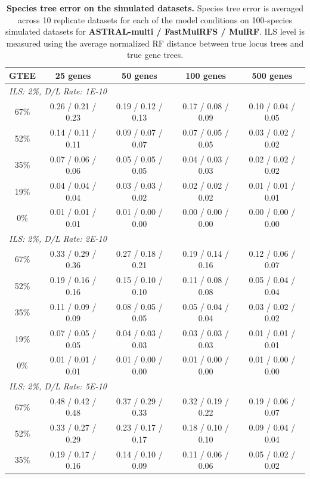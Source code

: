 \begin{table}[!h]
\centering
\setlength{\tabcolsep}{6pt}
\small
\caption{{\bf Species tree error on the simulated datasets.} Species tree error is averaged across 10 replicate datasets for each of the model conditions on 100-species simulated datasets for  \textbf{ASTRAL-multi / FastMulRFS / MulRF}. ILS level is
measured using the average normalized RF distance between true locus trees and true gene trees.}
\label{tab:fastmulrfs-error}
\begin{tabular}{ccccc}
\toprule
GTEE & 25 genes & 50 genes & 100 genes & 500 genes\\
\midrule
\multicolumn{5}{l}{\em ILS: 2\%, D/L Rate: 1E-10}\\[0.5ex]
67\% & 0.26 / 0.21 / 0.23 & 0.19 / 0.12 / 0.13 & 0.17 / 0.08 / 0.09 & 0.10 / 0.04 / 0.05\\
52\% & 0.14 / 0.11 / 0.11 & 0.09 / 0.07 / 0.07 & 0.07 / 0.05 / 0.05 & 0.03 / 0.02 / 0.02\\
35\% & 0.07 / 0.06 / 0.06 & 0.05 / 0.05 / 0.05 & 0.04 / 0.03 / 0.03 & 0.02 / 0.02 / 0.02\\
19\% & 0.04 / 0.04 / 0.04 & 0.03 / 0.03 / 0.02 & 0.02 / 0.02 / 0.02 & 0.01 / 0.01 / 0.01\\
0\% & 0.01 / 0.01 / 0.01 & 0.01 / 0.00 / 0.00 & 0.00 / 0.00 / 0.00 & 0.00 / 0.00 / 0.00\\[2ex]
\multicolumn{5}{l}{\em ILS: 2\%, D/L Rate: 2E-10}\\[0.5ex]
67\% & 0.33 / 0.29 / 0.36 & 0.27 / 0.18 / 0.21 & 0.19 / 0.14 / 0.16 & 0.12 / 0.06 / 0.07\\
52\% & 0.19 / 0.16 / 0.16 & 0.15 / 0.10 / 0.10 & 0.11 / 0.08 / 0.08 & 0.05 / 0.04 / 0.04\\
35\% & 0.11 / 0.09 / 0.09 & 0.08 / 0.05 / 0.05 & 0.05 / 0.04 / 0.04 & 0.03 / 0.02 / 0.02\\
19\% & 0.07 / 0.05 / 0.05 & 0.04 / 0.03 / 0.03 & 0.03 / 0.03 / 0.03 & 0.01 / 0.01 / 0.01\\
0\% & 0.01 / 0.01 / 0.01 & 0.01 / 0.00 / 0.00 & 0.01 / 0.00 / 0.00 & 0.01 / 0.00 / 0.00\\[2ex]
\multicolumn{5}{l}{\em ILS: 2\%, D/L Rate: 5E-10}\\[0.5ex]
67\% & 0.48 / 0.42 / 0.48 & 0.37 / 0.29 / 0.33 & 0.32 / 0.19 / 0.22 & 0.19 / 0.06 / 0.07\\
52\% & 0.33 / 0.27 / 0.29 & 0.23 / 0.17 / 0.17 & 0.18 / 0.10 / 0.10 & 0.09 / 0.04 / 0.04\\
35\% & 0.19 / 0.17 / 0.16 & 0.14 / 0.10 / 0.09 & 0.11 / 0.06 / 0.06 & 0.05 / 0.02 / 0.02\\

\end{tabular}
\end{table}
